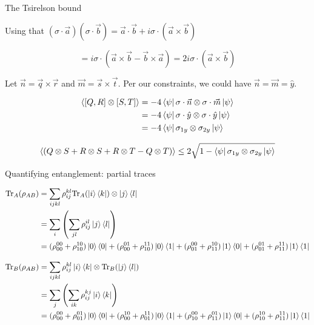 \documentclass[aspectratio=1610]{beamer}					%
\begin{document}
\begin{frame}{The Tsirelson bound}

Using that $(\sigma\cdot \vec{a})(\sigma\cdot \vec{b}) = \vec{a}\cdot \vec{b} + i\sigma\cdot(\vec{a}\times \vec{b})$

\begin{equation*}
[A,B] = i\sigma\cdot(\vec{a}\times\vec{b} - \vec{b}\times\vec{a}) = 2i\sigma\cdot(\vec{a}\times\vec{b})
\end{equation*}

Let $\vec{n} = \vec{q}\times\vec{r}$ and $\vec{m} = \vec{s}\times\vec{t}$. Per our constraints, we could have $\vec{n} = \vec{m} = \hat{y}$.

\begin{align*}
\langle [Q,R]\otimes [S,T]\rangle &= -4\bra{\psi}\sigma\cdot\vec{n}\otimes\sigma\cdot\vec{m}\ket{\psi}\\
&= -4\bra{\psi}\sigma\cdot\hat{y}\otimes\sigma\cdot\hat{y}\ket{\psi}\\
&= -4\bra{\psi}\sigma_{1y}\otimes\sigma_{2y}\ket{\psi}
\end{align*}

\begin{align*}
\langle(Q\otimes S + R\otimes S  + R\otimes T  - Q\otimes T)\rangle \leq 2\sqrt{1-\bra{\psi}\sigma_{1y}\otimes\sigma_{2y}\ket{\psi}}
\end{align*}

\end{frame}

\begin{frame}{Quantifying entanglement: partial traces}

\begin{align*}
\mathrm{Tr}_{A}(\rho_{AB}) &= \sum_{ijkl} \rho_{ij}^{kl} \mathrm{Tr}_{A}(\ket{i}\bra{k}) \otimes \ket{j}\bra{l}\\
&= \sum_{i} \left(\sum_{jl} \rho_{ij}^{il} \ket{j}\bra{l}\right)\\
&= (\rho_{00}^{00}+\rho_{10}^{10})\ket{0}\bra{0} + (\rho_{00}^{01}+\rho_{10}^{11})\ket{0}\bra{1} + (\rho_{01}^{00}+\rho_{11}^{10})\ket{1}\bra{0} + (\rho_{01}^{01}+\rho_{11}^{11})\ket{1}\bra{1}
\end{align*}

\begin{align*}
\mathrm{Tr}_{B}(\rho_{AB}) &= \sum_{ijkl} \rho_{ij}^{kl} \ket{i}\bra{k} \otimes \mathrm{Tr}_{B}(\ket{j}\bra{l})\\
&= \sum_{j} \left(\sum_{ik} \rho_{ij}^{kj} \ket{i}\bra{k}\right)\\
&= (\rho_{00}^{00}+\rho_{01}^{01})\ket{0}\bra{0} + (\rho_{00}^{10}+\rho_{01}^{11})\ket{0}\bra{1} + (\rho_{10}^{00}+\rho_{11}^{01})\ket{1}\bra{0} + (\rho_{10}^{10}+\rho_{11}^{11})\ket{1}\bra{1}
\end{align*}

\end{frame}
\end{document}
